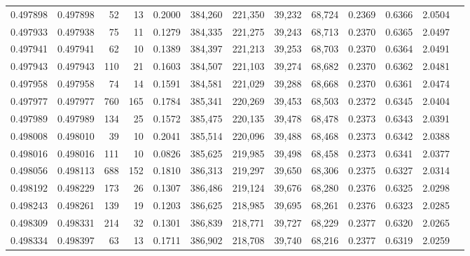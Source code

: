 \begin{tabular}{rrrrrrrrrrrrr}
0.497898 & 0.497898 &    52 &    13 &                                     0.2000 & 384,260 & 221,350 &  39,232 &  68,724 & 0.2369 & 0.6366 & 2.0504 \\
0.497933 & 0.497938 &    75 &    11 &                                     0.1279 & 384,335 & 221,275 &  39,243 &  68,713 & 0.2370 & 0.6365 & 2.0497 \\
0.497941 & 0.497941 &    62 &    10 &                                     0.1389 & 384,397 & 221,213 &  39,253 &  68,703 & 0.2370 & 0.6364 & 2.0491 \\
0.497943 & 0.497943 &   110 &    21 &                                     0.1603 & 384,507 & 221,103 &  39,274 &  68,682 & 0.2370 & 0.6362 & 2.0481 \\
0.497958 & 0.497958 &    74 &    14 &                                     0.1591 & 384,581 & 221,029 &  39,288 &  68,668 & 0.2370 & 0.6361 & 2.0474 \\
0.497977 & 0.497977 &   760 &   165 &                                     0.1784 & 385,341 & 220,269 &  39,453 &  68,503 & 0.2372 & 0.6345 & 2.0404 \\
0.497989 & 0.497989 &   134 &    25 &                                     0.1572 & 385,475 & 220,135 &  39,478 &  68,478 & 0.2373 & 0.6343 & 2.0391 \\
0.498008 & 0.498010 &    39 &    10 &                                     0.2041 & 385,514 & 220,096 &  39,488 &  68,468 & 0.2373 & 0.6342 & 2.0388 \\
0.498016 & 0.498016 &   111 &    10 &                                     0.0826 & 385,625 & 219,985 &  39,498 &  68,458 & 0.2373 & 0.6341 & 2.0377 \\
0.498056 & 0.498113 &   688 &   152 &                                     0.1810 & 386,313 & 219,297 &  39,650 &  68,306 & 0.2375 & 0.6327 & 2.0314 \\
0.498192 & 0.498229 &   173 &    26 &                                     0.1307 & 386,486 & 219,124 &  39,676 &  68,280 & 0.2376 & 0.6325 & 2.0298 \\
0.498243 & 0.498261 &   139 &    19 &                                     0.1203 & 386,625 & 218,985 &  39,695 &  68,261 & 0.2376 & 0.6323 & 2.0285 \\
0.498309 & 0.498331 &   214 &    32 &                                     0.1301 & 386,839 & 218,771 &  39,727 &  68,229 & 0.2377 & 0.6320 & 2.0265 \\
0.498334 & 0.498397 &    63 &    13 &                                     0.1711 & 386,902 & 218,708 &  39,740 &  68,216 & 0.2377 & 0.6319 & 2.0259 \\

\end{tabular}
